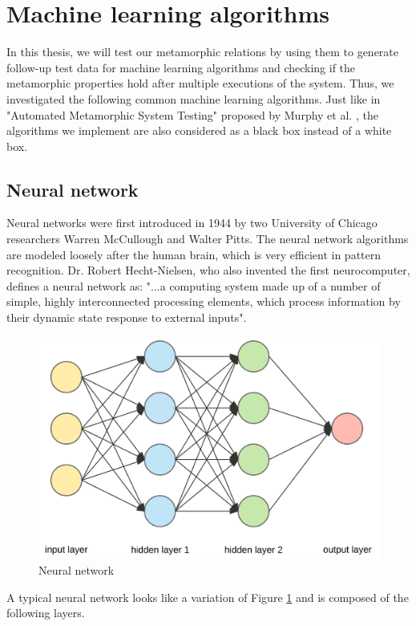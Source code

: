 \section{Machine learning algorithms}
In this thesis, we will test our metamorphic relations by using them to generate follow-up test data for machine learning algorithms and checking if the metamorphic properties hold after multiple executions of the system. Thus, we investigated the following common machine learning algorithms. Just like in "Automated Metamorphic System Testing" proposed by Murphy et al. \cite{Murphy2009}, the algorithms we implement are also considered as a black box instead of a white box.
\subsection{Neural network}
Neural networks were first introduced in 1944 by two University of Chicago researchers Warren McCullough and Walter Pitts. The neural network algorithms are modeled loosely after the human brain, which is very efficient in pattern recognition.  Dr. Robert Hecht-Nielsen, who also invented the first neurocomputer, defines a neural network as:
"...a computing system made up of a number of simple, highly interconnected processing elements, which process information by their dynamic state response to external inputs"\cite{Caudill}.
\begin{figure}[htb!]
    \centering
    \includegraphics[scale=0.15]{files/nn.png}
    \caption{Neural network}
    \label{Neural network}
    \end{figure}
    \FloatBarrier
A typical neural network looks like a variation of Figure \ref{Neural network} and is composed of the following layers. \\
